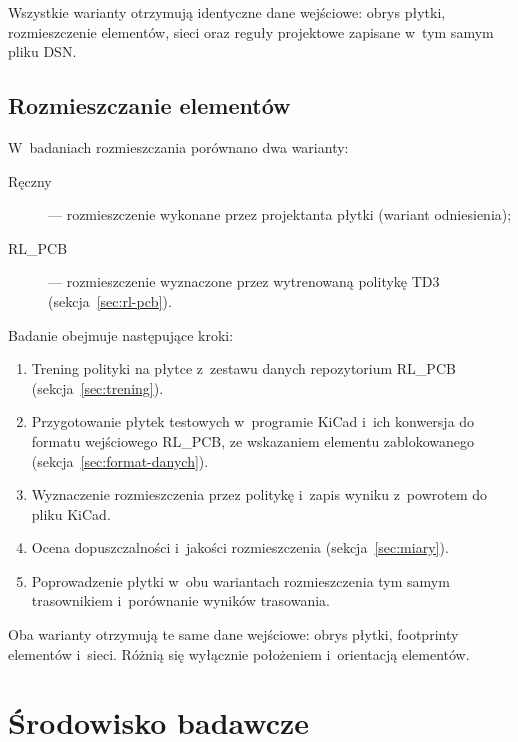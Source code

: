 Wszystkie warianty otrzymują identyczne dane wejściowe: obrys płytki, rozmieszczenie
elementów, sieci oraz reguły projektowe zapisane w~tym samym pliku DSN.

\subsection{Rozmieszczanie elementów}
\label{sec:przebieg-rozmieszczanie}

W~badaniach rozmieszczania porównano dwa warianty:
\begin{description}
  \item[Ręczny] --- rozmieszczenie wykonane przez projektanta płytki
    (wariant odniesienia);
  \item[RL\_PCB] --- rozmieszczenie wyznaczone przez wytrenowaną politykę
    TD3 (sekcja~\ref{sec:rl-pcb}).
\end{description}

Badanie obejmuje następujące kroki:
\begin{enumerate}
  \item Trening polityki na płytce z~zestawu danych repozytorium RL\_PCB
    (sekcja~\ref{sec:trening}).
  \item Przygotowanie płytek testowych w~programie KiCad i~ich konwersja
    do formatu wejściowego RL\_PCB, ze wskazaniem elementu zablokowanego
    (sekcja~\ref{sec:format-danych}).
  \item Wyznaczenie rozmieszczenia przez politykę i~zapis wyniku z~powrotem
    do pliku KiCad.
  \item Ocena dopuszczalności i~jakości rozmieszczenia
    (sekcja~\ref{sec:miary}).
  \item Poprowadzenie płytki w~obu wariantach rozmieszczenia tym samym
    trasownikiem i~porównanie wyników trasowania.
\end{enumerate}

Oba warianty otrzymują te same dane wejściowe: obrys płytki, footprinty
elementów i~sieci. Różnią się wyłącznie położeniem i~orientacją elementów.

\section{Środowisko badawcze}
\label{sec:srodowisko}

